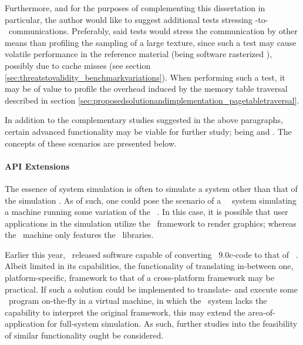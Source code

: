 Furthermore, and for the purposes of complementing this dissertation in particular, the author would like to suggest additional tests stressing \dvttermtarget -to-\dvttermhost\ communications.
Preferably, said tests would stress the communication by other means than profiling the sampling of a large texture, since such a test may cause volatile performance in the reference material (being software rasterized \dvttermsimics ), possibly due to cache misses (see section \ref{sec:threatstovalidity_benchmarkvariations}).
When performing such a test, it may be of value to profile the overhead induced by the memory table traversal described in section \ref{sec:proposedsolutionandimplementation_pagetabletraversal}.

In addition to the complementary studies suggested in the above paragraphs, certain advanced functionality may be viable for further study; being  and .
The concepts of these scenarios are presented below.

\paragraph{API Extensions}
\label{par:futurework_apiextensions}
The essence of system simulation is often to simulate a system other than that of the simulation \dvttermhost .
As of such, one could pose the scenario of a \dvttermlinux\ \dvttermhost\ system simulating a machine running some variation of the \dvttermwindows\ \dvttermos .
In this case, it is possible that user applications in the simulation utilize the \dvttermdirectx\ framework to render graphics; whereas the \dvttermhost\ machine only features the \dvttermopengl\ libraries.

Earlier this year, \dvttermvalve\ released software capable of converting \dvttermdirectx\ $9.0$c-code to that of \dvttermopengl ~.
Albeit limited in its capabilities, the functionality of translating in-between one, platform-specific, framework to that of a cross-platform framework may be practical.
If such a solution could be implemented to translate- and execute some \dvttermtarget\ program on-the-fly in a virtual machine, in which the \dvttermhost\ system lacks the capability to interpret the original framework, this may extend the area-of-application for full-system simulation.
As such, further studies into the feasibility of similar functionality ought be considered.

